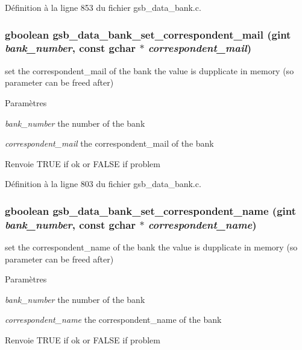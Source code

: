 Définition à la ligne 853 du fichier gsb\_\-data\_\-bank.c.

\subsubsection[{gsb\_\-data\_\-bank\_\-set\_\-correspondent\_\-mail}]{\setlength{\rightskip}{0pt plus 5cm}gboolean gsb\_\-data\_\-bank\_\-set\_\-correspondent\_\-mail (gint {\em bank\_\-number}, \/  const gchar $\ast$ {\em correspondent\_\-mail})}\label{gsb__data__bank_8h_a94d4c9895183a3ae80f9aa9844050876}
set the correspondent\_\-mail of the bank the value is dupplicate in memory (so parameter can be freed after)


\begin{DoxyParams}{Paramètres}
\item[{\em bank\_\-number}]the number of the bank \item[{\em correspondent\_\-mail}]the correspondent\_\-mail of the bank\end{DoxyParams}
\begin{DoxyReturn}{Renvoie}
TRUE if ok or FALSE if problem 
\end{DoxyReturn}


Définition à la ligne 803 du fichier gsb\_\-data\_\-bank.c.

\subsubsection[{gsb\_\-data\_\-bank\_\-set\_\-correspondent\_\-name}]{\setlength{\rightskip}{0pt plus 5cm}gboolean gsb\_\-data\_\-bank\_\-set\_\-correspondent\_\-name (gint {\em bank\_\-number}, \/  const gchar $\ast$ {\em correspondent\_\-name})}\label{gsb__data__bank_8h_a16525ec53d58eae12caa1f4c84eac4a1}
set the correspondent\_\-name of the bank the value is dupplicate in memory (so parameter can be freed after)


\begin{DoxyParams}{Paramètres}
\item[{\em bank\_\-number}]the number of the bank \item[{\em correspondent\_\-name}]the correspondent\_\-name of the bank\end{DoxyParams}
\begin{DoxyReturn}{Renvoie}
TRUE if ok or FALSE if problem 
\end{DoxyReturn}


